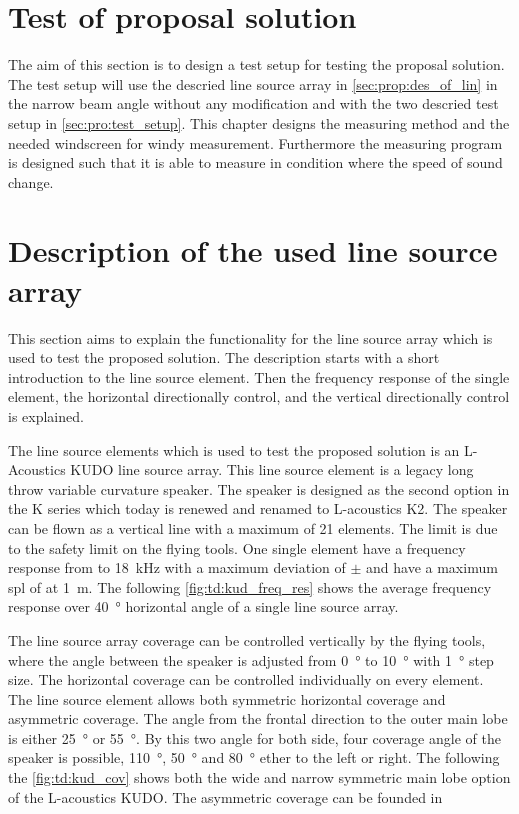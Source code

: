 \section{Test of proposal solution}
The aim of this section is to design a test setup for testing the proposal solution. The test setup will use the descried line source array in \autoref{sec:prop:des_of_lin} in the narrow beam angle without any modification and with the two descried test setup in \autoref{sec:pro:test_setup}. This chapter designs the measuring method and the needed windscreen for windy measurement. Furthermore the measuring program is designed such that it is able to measure in condition where the speed of sound change.


\section{Description of the used line source array}\label{sec:prop:des_of_lin}

This section aims to explain the functionality for the line source array which is used to test the proposed solution. The description starts with a short introduction to the line source element. Then the frequency response of the single element, the horizontal directionally control, and the vertical directionally control is explained.

The line source elements which is used to test the proposed solution is an L-Acoustics KUDO line source array. This line source element is a legacy long throw variable curvature speaker. The speaker is designed as the second option in the K series which today is renewed and renamed to L-acoustics K2. The speaker can be flown as a vertical line with a maximum of 21 elements. The limit is due to the safety limit on the flying tools. One single element have a frequency response from  to \SI{18}{\kilo\hertz} with a maximum deviation of $\pm$  and have a maximum \gls{spl} of  at \SI{1}{\meter}. The following \autoref{fig:td:kud_freq_res} shows the average frequency response over \SI{40}{\degree} horizontal angle of a single line source array.



The line source array coverage can be controlled vertically by the flying tools, where the angle between the speaker is adjusted from \SI{0}{\degree} to \SI{10}{\degree} with \SI{1}{\degree} step size. The horizontal coverage can be controlled individually on every element. The line source element allows both symmetric horizontal coverage and asymmetric coverage. The angle from the frontal direction to the outer main lobe  is either \SI{25}{\degree} or \SI{55}{\degree}. By this two angle for both side, four coverage angle of the speaker is possible, \SI{110}{\degree}, \SI{50}{\degree} and \SI{80}{\degree} ether to the left or right. The following the \autoref{fig:td:kud_cov} shows both the wide and narrow symmetric main lobe option of the L-acoustics KUDO. The asymmetric coverage can be founded in \citep{KUDO_data}

